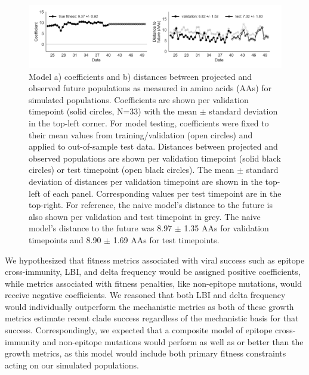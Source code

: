 \begin{figure}[ht!]
  \begin{center}
  \includegraphics[width=\textwidth]{figures/unadjusted-model-accuracy-and-coefficients-for-simulated-populations-controls.png}
  \caption{
    Model a) coefficients and b) distances between projected and observed future populations as measured in amino acids (AAs) for simulated populations.
    Coefficients are shown per validation timepoint (solid circles, N=33) with the mean $\pm$ standard deviation in the top-left corner.
    For model testing, coefficients were fixed to their mean values from training/validation (open circles) and applied to out-of-sample test data.
    Distances between projected and observed populations are shown per validation timepoint (solid black circles) or test timepoint (open black circles).
    The mean $\pm$ standard deviation of distances per validation timepoint are shown in the top-left of each panel.
    Corresponding values per test timepoint are in the top-right.
    For reference, the naive model's distance to the future is also shown per validation and test timepoint in grey.
    The naive model's distance to the future was 8.97 $\pm$ 1.35 AAs for validation timepoints and 8.90 $\pm$ 1.69 AAs for test timepoints.
  }
  \label{fig:unadjusted_model_accuracy_and_coefficients_for_simulated_populations_controls}
  \end{center}
\end{figure}

We hypothesized that fitness metrics associated with viral success such as epitope cross-immunity, LBI, and delta frequency would be assigned positive coefficients, while metrics associated with fitness penalties, like non-epitope mutations, would receive negative coefficients.
We reasoned that both LBI and delta frequency would individually outperform the mechanistic metrics as both of these growth metrics estimate recent clade success regardless of the mechanistic basis for that success.
Correspondingly, we expected that a composite model of epitope cross-immunity and non-epitope mutations would perform as well as or better than the growth metrics, as this model would include both primary fitness constraints acting on our simulated populations.

